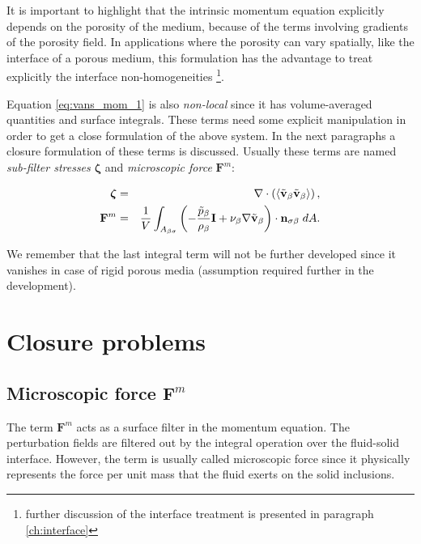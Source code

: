 It is important to highlight that the intrinsic momentum equation explicitly depends on the porosity of the medium, because of the terms involving gradients of the porosity field.
In applications where the porosity can vary spatially, like the interface of a porous medium, this formulation has the advantage to treat explicitly the interface non-homogeneities \footnote{further discussion of the interface treatment is presented in paragraph \ref{ch:interface}}.


Equation \eqref{eq:vans_mom_1} is also \textit{non-local} since it has volume-averaged quantities and surface integrals.
These terms need some explicit manipulation in order to get a close formulation of the above system.
In the next paragraphs a closure formulation of these terms is discussed. Usually these terms are named \textit{sub-filter stresses} $\boldsymbol{\zeta}$ and \textit{microscopic force} $\mathbf{F}^m$:

\begin{eqnarray}
\boldsymbol{\zeta}&=& \nabla \cdot \left({\left< \tilde{\textbf{v}}_{\beta} \tilde{\textbf{v}}_{\beta} \right>}\right), \nonumber \\
\mathbf{F}^m &=&  \dfrac{1}{V} \int_{A_{\beta \sigma}} \left(-\dfrac{\tilde{p}_{\beta}}{\rho_{\beta}} \mathbf{I}  + \nu_{\beta} \nabla \tilde{\textbf{v}}_{\beta} \right)\cdot \mathbf{n}_{\sigma \beta} \;dA. \nonumber
\end{eqnarray}

We remember that the last integral term will not be further developed since it vanishes in case of rigid porous media (assumption required further in the development).



\section{Closure problems}

\subsection{Microscopic force $\mathbf{F}^m$}
\label{ch:closure_fm}
The term $\mathbf{F}^m$ acts as a surface filter in the momentum equation. The perturbation fields are filtered out by the integral operation over the fluid-solid interface. However, the term is usually called microscopic force since it physically represents the force per unit mass that the fluid exerts on the solid inclusions.

